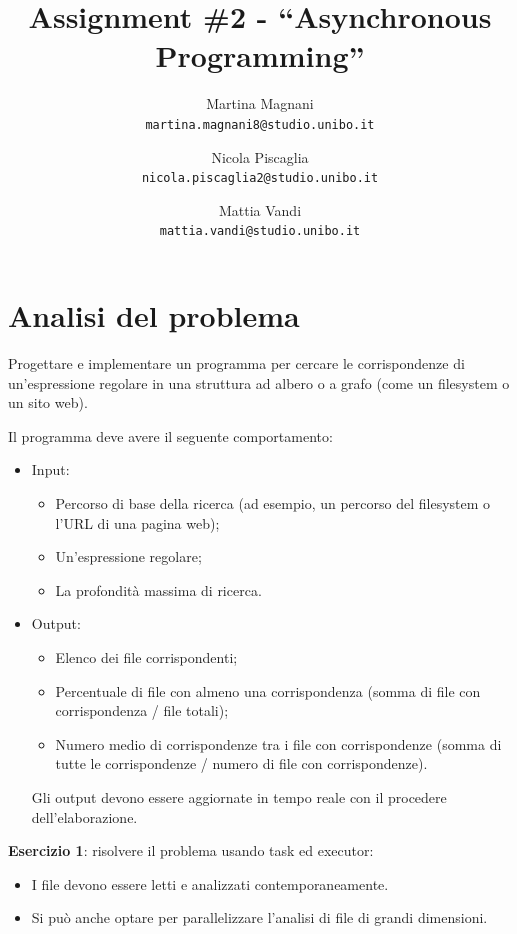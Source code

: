 \documentclass[a4paper]{article}
\title{\LARGE \bf
Assignment \#2 - ``Asynchronous Programming''
}
\author{
    Martina Magnani\\
    \texttt{martina.magnani8@studio.unibo.it}
    \and
    Nicola Piscaglia\\
    \texttt{nicola.piscaglia2@studio.unibo.it}
    \and
    Mattia Vandi\\
    \texttt{mattia.vandi@studio.unibo.it}
}
\date{}
\begin{document}
\maketitle

\section{Analisi del problema}\label{analisi-del-problema}

Progettare e implementare un programma per cercare le corrispondenze di un'espressione regolare in una struttura ad albero o a grafo (come un filesystem o un sito web).

Il programma deve avere il seguente comportamento:

\begin{itemize}
%
    \item Input\label{input}:
%
        \begin{itemize}
%
            \item Percorso di base della ricerca (ad esempio, un percorso del filesystem o l'URL di una pagina web);
%
            \item Un'espressione regolare;
%
            \item La profondit\`a massima di ricerca.
%
        \end{itemize}
%
    \item Output\label{output}:
%
        \begin{itemize}
%
            \item Elenco dei file corrispondenti;
%
            \item Percentuale di file con almeno una corrispondenza (somma di file con corrispondenza / file totali);
%
            \item Numero medio di corrispondenze tra i file con corrispondenze (somma di tutte le corrispondenze / numero di file con corrispondenze).
%
        \end{itemize}
%
        Gli output devono essere aggiornate in tempo reale con il procedere dell'elaborazione.
%
\end{itemize}

\textbf{Esercizio 1}: risolvere il problema usando task ed executor:

\begin{itemize}
%
    \item I file devono essere letti e analizzati contemporaneamente.
%
    \item Si pu\`o anche optare per parallelizzare l'analisi di file di grandi dimensioni.
%
\end{itemize}
\end{document}

